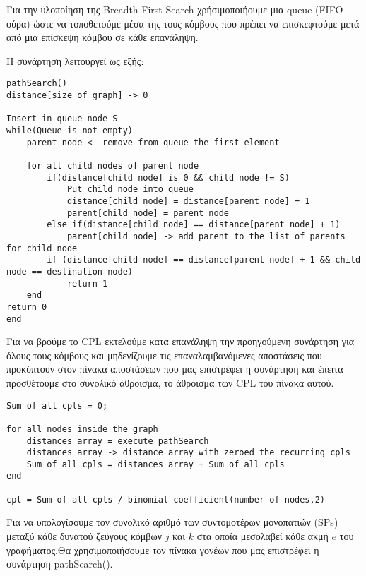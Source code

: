 \documentclass{article}
\begin{document}
Για την υλοποίηση της  Breadth First Search χρήσιμοποιήουμε μια queue (FIFO ούρα) ώστε να τοποθετούμε μέσα της τους κόμβους που πρέπει να επισκεφτούμε μετά από μια επίσκεψη κόμβου σε κάθε επανάληψη.\pagebreak

Η συνάρτηση λειτουργεί ως εξής:

\begin{lstlisting}
pathSearch()
distance[size of graph] -> 0

Insert in queue node S
while(Queue is not empty)
	parent node <- remove from queue the first element
	
	for all child nodes of parent node
		if(distance[child node] is 0 && child node != S)
			Put child node into queue
			distance[child node] = distance[parent node] + 1
			parent[child node] = parent node
		else if(distance[child node] == distance[parent node] + 1)
			parent[child node] -> add parent to the list of parents for child node
		if (distance[child node] == distance[parent node] + 1 && child node == destination node)
			return 1
	end	
return 0
end
\end{lstlisting}\bigbreak
{}

Για να βρούμε το CPL εκτελούμε κατα επανάληψη την προηγούμενη συνάρτηση για όλους τους κόμβους και μηδενίζουμε τις επαναλαμβανόμενες αποστάσεις που προκύπτουν στον πίνακα αποστάσεων που μας επιστρέφει η συνάρτηση και έπειτα προσθέτουμε στο συνολικό άθροισμα, το άθροισμα των CPL του πίνακα αυτού.\pagebreak

\begin{lstlisting}
Sum of all cpls = 0;

for all nodes inside the graph
	distances array = execute pathSearch
	distances array -> distance array with zeroed the recurring cpls
	Sum of all cpls = distances array + Sum of all cpls
end

cpl = Sum of all cpls / binomial coefficient(number of nodes,2)
\end{lstlisting}\bigbreak
{}

Για να υπολογίσουμε τον συνολικό αριθμό των συντομοτέρων μονοπατιών (SPs) μεταξύ κάθε δυνατού ζεύγους κόμβων $j$ και $k$ στα οποία μεσολαβεί κάθε ακμή $e$ του γραφήματος.Θα χρησιμοποιήσουμε τον πίνακα γονέων που μας επιστρέφει η συνάρτηση
pathSearch().\bigbreak
\end{document}
